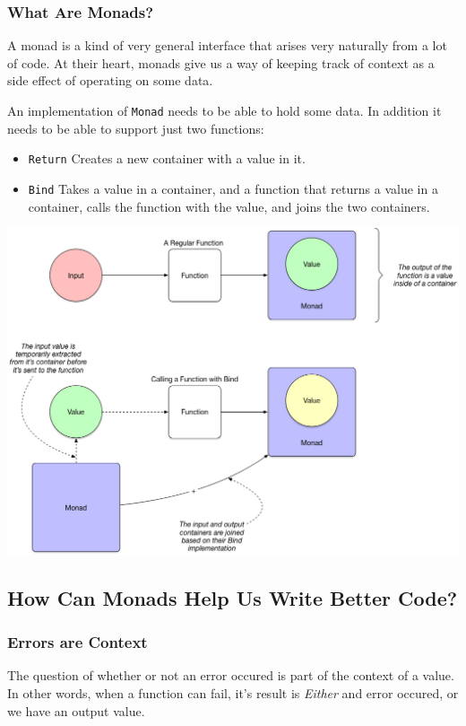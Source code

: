 \documentclass{beamer}
\begin{document}
\begin{frame}
  \frametitle{What Are Monads?}
  A monad is a kind of very general interface that arises very
  naturally from a lot of code.  At their heart, monads give us a way
  of keeping track of context as a side effect of operating on some
  data.

  \par\pause
  An implementation of {\tt Monad} needs to be able to hold some
  data. In addition it needs to be able to support just two functions:
  \begin{itemize}
  \item {\tt Return} Creates a new container with a value in it.
  \item {\tt Bind} Takes a value in a container, and a function that
    returns a value in a container, calls the function with the value,
    and joins the two containers.
  \end{itemize}
\end{frame}

\begin{frame}
  \begin{center}
    \includegraphics[height=.85\paperheight]{images/small/monads_visualized}
  \end{center}
\end{frame}

\subsection{How Can Monads Help Us Write Better Code?}
\begin{frame}
  \frametitle{Errors are Context}
  The question of whether or not an error occured is part of the
  context of a value.  In other words, when a function can fail, it's
  result is \emph{Either} and error occured, or we have an output
  value.
\end{frame}
\end{document}
